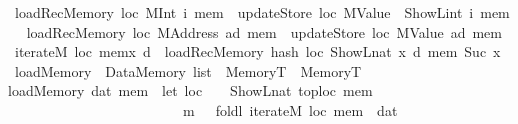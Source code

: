 \begin{isabellebody}
{\isacharbar}{\kern0pt}\ {\isachardoublequoteopen}loadRec\isactrlsub M\isactrlsub e\isactrlsub m\isactrlsub o\isactrlsub r\isactrlsub y\ loc\ {\isacharparenleft}{\kern0pt}MInt\ i{\isacharparenright}{\kern0pt}\ mem\ {\isacharequal}{\kern0pt}\ updateStore\ loc\ {\isacharparenleft}{\kern0pt}{\isacharparenleft}{\kern0pt}MValue\ {\isasymcirc}\ ShowL\isactrlsub i\isactrlsub n\isactrlsub t{\isacharparenright}{\kern0pt}\ i{\isacharparenright}{\kern0pt}\ mem\ {\isachardoublequoteclose}\isanewline
{\isacharbar}{\kern0pt}\ {\isachardoublequoteopen}loadRec\isactrlsub M\isactrlsub e\isactrlsub m\isactrlsub o\isactrlsub r\isactrlsub y\ loc\ {\isacharparenleft}{\kern0pt}MAddress\ ad{\isacharparenright}{\kern0pt}\ mem\ {\isacharequal}{\kern0pt}\ updateStore\ loc\ {\isacharparenleft}{\kern0pt}MValue\ ad{\isacharparenright}{\kern0pt}\ mem{\isachardoublequoteclose}\isanewline
{\isacharbar}{\kern0pt}\ {\isachardoublequoteopen}iterateM\ loc\ {\isacharparenleft}{\kern0pt}mem{\isacharcomma}{\kern0pt}x{\isacharparenright}{\kern0pt}\ d\ {\isacharequal}{\kern0pt}\ {\isacharparenleft}{\kern0pt}loadRec\isactrlsub M\isactrlsub e\isactrlsub m\isactrlsub o\isactrlsub r\isactrlsub y\ {\isacharparenleft}{\kern0pt}hash\ loc\ {\isacharparenleft}{\kern0pt}ShowL\isactrlsub n\isactrlsub a\isactrlsub t\ x{\isacharparenright}{\kern0pt}{\isacharparenright}{\kern0pt}\ d\ mem{\isacharcomma}{\kern0pt}\ Suc\ x{\isacharparenright}{\kern0pt}{\isachardoublequoteclose}\isanewline
\isanewline
{}\isamarkupfalse%
\ load\isactrlsub M\isactrlsub e\isactrlsub m\isactrlsub o\isactrlsub r\isactrlsub y\ {\isacharcolon}{\kern0pt}{\isacharcolon}{\kern0pt}\ {\isachardoublequoteopen}Data\isactrlsub M\isactrlsub e\isactrlsub m\isactrlsub o\isactrlsub r\isactrlsub y\ list\ {\isasymRightarrow}\ MemoryT\ {\isasymRightarrow}\ MemoryT{\isachardoublequoteclose}\ \isanewline
{\isachardoublequoteopen}load\isactrlsub M\isactrlsub e\isactrlsub m\isactrlsub o\isactrlsub r\isactrlsub y\ dat\ mem\ {\isacharequal}{\kern0pt}\ {\isacharparenleft}{\kern0pt}let\ loc\ \ \ {\isacharequal}{\kern0pt}\ ShowL\isactrlsub n\isactrlsub a\isactrlsub t\ {\isacharparenleft}{\kern0pt}toploc\ mem{\isacharparenright}{\kern0pt}{\isacharsemicolon}{\kern0pt}\isanewline
\ \ \ \ \ \ \ \ \ \ \ \ \ \ \ \ \ \ \ \ \ \ \ \ \ {\isacharparenleft}{\kern0pt}m{\isacharcomma}{\kern0pt}\ {\isacharunderscore}{\kern0pt}{\isacharparenright}{\kern0pt}\ {\isacharequal}{\kern0pt}\ foldl\ {\isacharparenleft}{\kern0pt}iterateM\ loc{\isacharparenright}{\kern0pt}\ {\isacharparenleft}{\kern0pt}mem{\isacharcomma}{\kern0pt}\ {}{\isacharparenright}{\kern0pt}\ dat\isanewline

\end{isabellebody}

